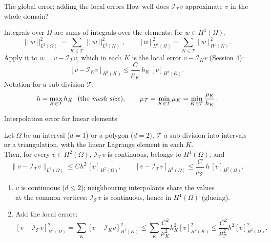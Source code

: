 \begin{frame}{The global error: adding the local errors}
    How well does $\mathcal I_{\mathcal T} v$ approximate $v$ in the whole domain?
    \medskip

    Integrals over $\Omega$ are sums of integrals over the elements: for $w \in H^1(\Omega)$,
    \[
        \|w\|^2_{L^2(\Omega)} = \sum_{K \in \mathcal T} \|w\|^2_{L^2(K)},
        \qquad
        [w]^2_{H^1(\Omega)} = \sum_{K \in \mathcal T} [w]^2_{H^1(K)} .
    \]
    Apply it to $w = v - \mathcal I_{\mathcal T} v$, which in each $K$ is the local error $v - \mathcal I_K v$ (Session 4):
    \[
        [v - \mathcal I_K v]_{H^1(K)} \le \frac{C}{\mu_K}\, h_K\, [v]_{H^2(K)} .
    \]
    Notation for a sub-division $\mathcal T$:
    \[
        h = \max_{K \in \mathcal T} h_K \ \ (\text{the \emph{mesh size}}),
        \qquad
        \mu_{\mathcal T} = \min_{K \in \mathcal T} \mu_K = \min_{K \in \mathcal T} \frac{\rho_K}{h_K}.
    \]
\end{frame}

\begin{frame}{Interpolation error for linear elements}
    \begin{theorem}
        Let $\Omega$ be an interval ($d=1$) or a polygon ($d=2$), $\mathcal T$ a sub-division into intervals\\ or a triangulation, with the linear Lagrange element in each $K$.\\
        Then, for every $v \in H^2(\Omega)$, $\mathcal I_{\mathcal T} v$ is continuous, belongs to $H^1(\Omega)$, and
        \[
            \|v - \mathcal I_{\mathcal T} v\|_{L^2(\Omega)} \le C h^2\, [v]_{H^2(\Omega)},
            \qquad
            [v - \mathcal I_{\mathcal T} v]_{H^1(\Omega)} \le \frac{C}{\mu_{\mathcal T}}\, h\, [v]_{H^2(\Omega)} .
        \]
    \end{theorem}
    \begin{proofsteps}
        \begin{enumerate}
            \item $v$ is continuous ($d \le 2$); neighbouring interpolants share the values\\ at the common vertices: $\mathcal I_{\mathcal T} v$ is continuous, hence in $H^1(\Omega)$ (glueing).
            \item Add the local errors:
                  \[
                      [v - \mathcal I_{\mathcal T} v]^2_{H^1(\Omega)} = \sum_{K} [v - \mathcal I_K v]^2_{H^1(K)}
                      \le \sum_K \frac{C^2}{\mu_K^2} h_K^2 [v]^2_{H^2(K)}
                      \le \frac{C^2}{\mu_{\mathcal T}^2} h^2 [v]^2_{H^2(\Omega)} .
                  \]
        \end{enumerate}
    \end{proofsteps}
\end{frame}

